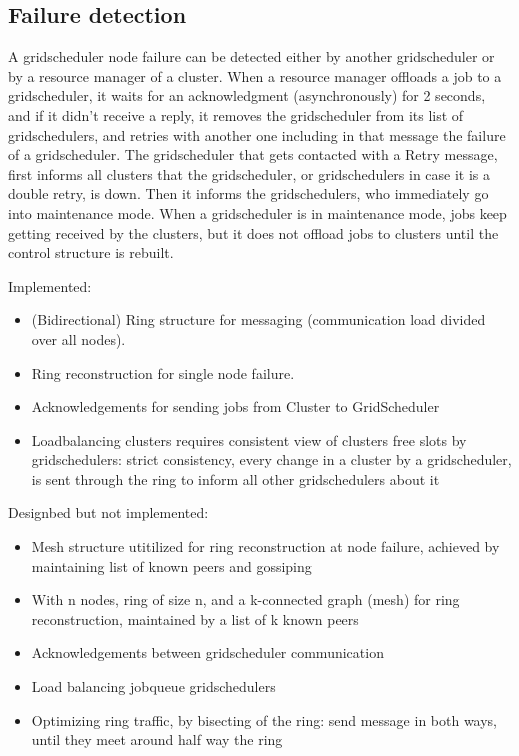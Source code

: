 \documentclass[twocolumn,a4paper]{article}
\begin{document}
\subsection{Failure detection}
A gridscheduler node failure can be detected either by another gridscheduler or by a resource manager of a cluster.
When a resource manager offloads a job to a gridscheduler, it waits for an acknowledgment (asynchronously) for 2 seconds, and if it didn't receive a reply, it removes the gridscheduler from its list of gridschedulers, and retries with another one including in that message the failure of a gridscheduler. The gridscheduler that gets contacted with a Retry message, first informs all clusters that the gridscheduler, or gridschedulers in case it is a double retry, is down. Then it informs the gridschedulers, who immediately go into maintenance mode. When a gridscheduler is in maintenance mode, jobs keep getting received by the clusters, but it does not offload jobs to clusters until the control structure is rebuilt.

Implemented:
\begin{itemize}
	\item (Bidirectional) Ring structure for messaging (communication load divided over all nodes).
	\item Ring reconstruction for single node failure.
	\item Acknowledgements for sending jobs from Cluster to GridScheduler
	\item Loadbalancing clusters requires consistent view of clusters free slots by gridschedulers: strict consistency, every change in a cluster by a gridscheduler, is sent through the ring to inform all other gridschedulers about it
\end{itemize}

Designbed but not implemented:
\begin{itemize}
	\item Mesh structure utitilized for ring reconstruction at node failure, achieved by maintaining list of known peers and gossiping
	\item With n nodes, ring of size n, and a k-connected graph (mesh) for ring reconstruction, maintained by a list of k known peers
	\item Acknowledgements between gridscheduler communication
	\item Load balancing jobqueue gridschedulers
	\item Optimizing ring traffic, by bisecting of the ring: send message in both ways, until they meet around half way the ring
\end{itemize}
\end{document}
